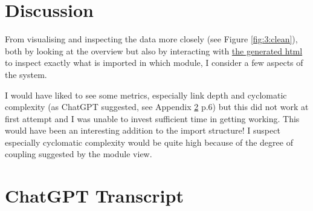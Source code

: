 \documentclass{article}
\begin{document}


\section{Discussion}
\label{discussion}

From visualising and inspecting the data more closely (see Figure \ref{fig:3:clean}), 
both by looking at the overview but also by interacting with 
\href{https://github.com/bjarkebrodin/recovery/blob/master/top_lvl_imports.html}{the generated html}
to inspect exactly what is imported in which module,
I consider a few aspects of the system.





\vspace*{1em}
\noindent
I would have liked to see some metrics, 
especially link depth and cyclomatic complexity (as ChatGPT suggested, see Appendix \ref{apx:a} p.6) 
but this did not work at first attempt and I was unable to invest sufficient time in getting working.
This would have been an interesting addition to the import structure!
I suspect especially cyclomatic complexity would be quite high 
because of the degree of coupling suggested by the module view.

\clearpage



\clearpage
\appendix
\section{ChatGPT Transcript}
\label{apx:a}
\begin{figure}[h]

\end{figure}

\end{document}
